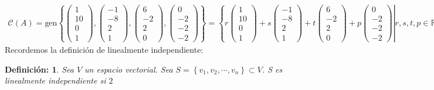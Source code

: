 \documentclass[11pt,letterpaper]{article}
\newcommand{\mR}{\mathbb{R}}
\newcommand{\gen}{\text{gen}}
\newtheorem{thmd}{Definición:}
\begin{document}
\begin{enumerate}
\begin{align*}
\mathcal{C}(A)=\gen \left\{\begin{pmatrix}
1\\
10\\
0\\
1
\end{pmatrix}, \begin{pmatrix}
-1\\
-8\\
2\\
1
\end{pmatrix},\begin{pmatrix}
6\\
-2\\
2\\
0
\end{pmatrix},\begin{pmatrix}
0\\
-2\\
-2\\
-2
\end{pmatrix}\right\}=\left\{  \left. r\begin{pmatrix}
1\\
10\\
0\\
1
\end{pmatrix}+s\begin{pmatrix}
-1\\
-8\\
2\\
1
\end{pmatrix}+t\begin{pmatrix}
6\\
-2\\
2\\
0
\end{pmatrix}+p\begin{pmatrix}
0\\
-2\\
-2\\
-2
\end{pmatrix} \right| r,s,t,p\in \mR \right\}.
\end{align*}
Recordemos la definición de linealmente independiente:
\begin{framed}
    \begin{thmd} \label{linealemente_ind}
    Sea $V$ un espacio vectorial. Sea $S=\left\{v_1, v_2, \cdots , v_n \right\} \subset V$. S es linealmente independiente si $2$
    \end{thmd}
\end{framed} 


\end{enumerate}
\end{document}

